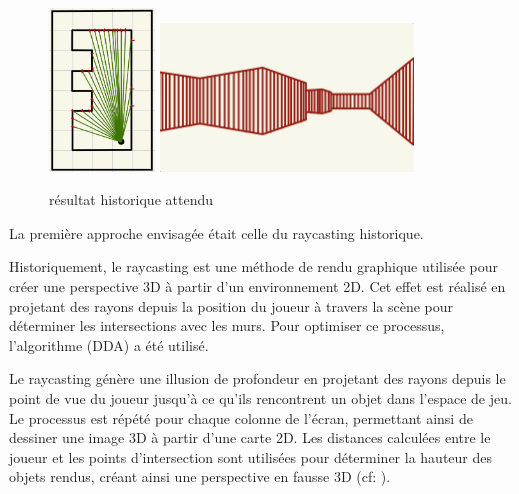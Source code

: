\documentclass[11pt]{article}
\begin{document}
\begin{figure}
	\center
	\includegraphics[width=0.25\textwidth]{image/projection2D.jpeg}
	\raisebox{2cm}{
		\hspace{2mm}$\Longrightarrow$\hspace{2mm}
	}
	\includegraphics[width=0.6\textwidth]{image/rendu-historique.jpg}
	\caption{résultat historique attendu}
	\label{fig:result-histo}
\end{figure}

La première approche envisagée était celle du raycasting historique.

Historiquement, le raycasting est une méthode de rendu graphique utilisée pour créer une perspective 3D à partir d'un environnement 2D. Cet effet est réalisé en projetant des 
rayons depuis la position du joueur à travers la scène pour déterminer les intersections avec les murs. Pour optimiser ce
processus, l'algorithme (DDA) a été utilisé.

Le raycasting génère une illusion de profondeur en projetant des rayons depuis le point de vue du joueur jusqu'à ce qu'ils rencontrent un 
objet dans l'espace de jeu. Le processus est répété pour chaque colonne de l'écran, permettant ainsi de dessiner une image 3D à partir d'une
carte 2D. Les distances calculées entre le joueur et les points d'intersection sont utilisées pour déterminer la hauteur des objets rendus, 
créant ainsi une perspective en fausse 3D (cf: ).
\end{document}
